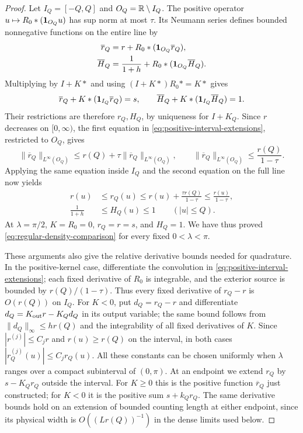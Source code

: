 \begin{proof}
Let $I_Q=[-Q,Q]$ and $O_Q=\mathbb R\setminus I_Q$.
The positive operator $u\mapsto R_0*(\mathbf1_{O_Q}u)$ has
sup norm at most $\tau$.  Its Neumann series defines bounded
nonnegative functions on the entire line by
\begin{equation}\label{eq:positive-interval-extensions}
 \begin{aligned}
 \overline r_Q&=r+R_0*(\mathbf1_{O_Q}\overline r_Q),\\
 \overline H_Q&=\frac1{1+h}
                     +R_0*(\mathbf1_{O_Q}\overline H_Q).
 \end{aligned}
\end{equation}
Multiplying by $I+K*$ and using $(I+K*)R_0*=K*$ gives
\[
 \overline r_Q+K*(\mathbf1_{I_Q}\overline r_Q)=s,
 \qquad
 \overline H_Q+K*(\mathbf1_{I_Q}\overline H_Q)=1.
\]
Their restrictions are therefore $r_Q,H_Q$, by uniqueness for
$I+K_Q$.  Since $r$ decreases on $[0,\infty)$,
the first equation in \eqref{eq:positive-interval-extensions},
restricted to $O_Q$, gives
\[
 \|\overline r_Q\|_{L^\infty(O_Q)}
 \le r(Q)+\tau\|\overline r_Q\|_{L^\infty(O_Q)},
 \qquad
 \|\overline r_Q\|_{L^\infty(O_Q)}\le\frac{r(Q)}{1-\tau}.
\]
Applying the same equation inside $I_Q$ and the second equation
on the full line now yields
\begin{equation}\label{eq:positive-interval-comparison}
 \begin{aligned}
 r(u)&\le r_Q(u)\le r(u)+\frac{\tau r(Q)}{1-\tau}
                         \le\frac{r(u)}{1-\tau},\\
 \frac1{1+h}&\le H_Q(u)\le1\qquad(|u|\le Q).
 \end{aligned}
\end{equation}
At $\lambda=\pi/2$, $K=R_0=0$, $r_Q=r=s$, and $H_Q=1$.
We have thus proved \eqref{eq:regular-density-comparison} for
every fixed $0<\lambda<\pi$.

These arguments also give the relative derivative bounds needed
for quadrature.  In the positive-kernel case, differentiate the
convolution in \eqref{eq:positive-interval-extensions}; each fixed
derivative of $R_0$ is integrable, and the exterior source is
bounded by $r(Q)/(1-\tau)$.  Thus every fixed derivative of
$r_Q-r$ is $O(r(Q))$ on $I_Q$.
For $K<0$, put $d_Q=r_Q-r$ and differentiate
$d_Q=K_{\rm out}r-K_Qd_Q$ in its output variable; the same
bound follows from $\|d_Q\|_\infty\le h r(Q)$ and the
integrability of all fixed derivatives of $K$.
Since $|r^{(j)}|\le C_jr$ and $r(u)\ge r(Q)$ on the interval,
in both cases $|r_Q^{(j)}(u)|\le C_jr_Q(u)$.
All these constants can be chosen uniformly when $\lambda$
ranges over a compact subinterval of $(0,\pi)$.
At an endpoint we extend $r_Q$ by $s-K_Qr_Q$ outside the interval.
For $K\ge0$ this is the positive function $\overline r_Q$ just
constructed; for $K<0$ it is the positive sum $s+k_Qr_Q$.
The same derivative bounds hold on an extension of bounded counting
length at either endpoint, since its physical width is
$O((Lr(Q))^{-1})$ in the dense limits used below.


\end{proof}
